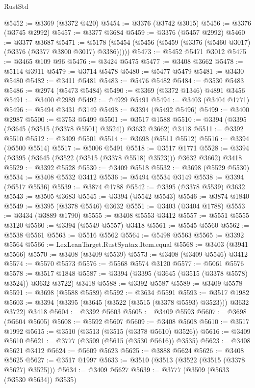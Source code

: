 \begin{lexlean}{RustStd}
\begin{coremodule}
@5452 := @3369 (@3372 @420)
@5454 := @3376 (@3742 @3015)
@5456 := @3376 (@3745 @2992)
@5457 := @3377 @3684
@5459 := @3376 (@5457 @2992)
@5460 := @3377 @3687
@5471 := @5178 (@5454 (@5456 (@5459 (@3376 (@5460 @3017) (@3376 (@3377 @3800 @3017) @3386)))))
@5473 := @5452 @5471 @3012
@5475 := @3465 @109 @96
@5476 := @3424 @5475
@5477 := @3408 @3662
@5478 := @5114 @3911
@5479 := @3714 @5478
@5480 := @5477 @5479
@5481 := @3430 @5480
@5482 := @3411 @5481
@5483 := @5476 @5482
@5484 := @3530 @5483
@5486 := @2974 (@5473 @5484)
@5490 := @3369 (@3372 @1346) @4891 @3456
@5491 := @3400 @2989
@5492 := @4929 @5491
@5494 := @3403 (@3404 @1771)
@5496 := @5494 @3431 @3149
@5498 := @3394 (@5492 @5496)
@5499 := @3400 @2987
@5500 := @3753 @5499
@5501 := @3517 @1588
@5510 := @3394 (@3395 (@3645 (@3515 (@3378 @5501) @3524)) @3632 @3662) @3418
@5511 := @3392 @5510
@5512 := @3409 @5501
@5514 := @3698 (@5511 @5512)
@5516 := @3394 (@5500 @5514)
@5517 := @5006 @5491
@5518 := @3517 @1771
@5528 := @3394 (@3395 (@3645 (@3522 (@3515 (@3378 @5518) @3523))) @3632 @3662) @3418
@5529 := @3392 @5528
@5530 := @3409 @5518
@5532 := @3698 (@5529 @5530)
@5534 := @3408 @5532 @3412
@5536 := @5494 @5534 @3149
@5538 := @3394 (@5517 @5536)
@5539 := @3874 @1788
@5542 := @3395 (@3378 @5539) @3632
@5543 := @3505 @3683
@5545 := @3394 (@5542 @5543)
@5546 := @3874 @1840
@5549 := @3395 (@3378 @5546) @3632
@5551 := @3403 (@3404 @1788)
@5553 := @3434 (@3889 @1790)
@5555 := @3408 @5553 @3412
@5557 := @5551 @5555 @3120
@5560 := @3394 (@5549 @5557) @3418
@5561 := @5545 @5560
@5562 := @5538 @5561
@5563 := @5516 @5562
@5564 := @5498 @5563
@5565 := @3392 @5564
@5566 := LexLeanTarget.RustSyntax.Item.equal
@5568 := @3403 (@3941 @5566)
@5570 := @3408 (@3409 @5539)
@5573 := @3408 (@3409 @5546) @3412
@5574 := @5570 @5573
@5576 := @5568 @5574 @3120
@5577 := @5061 @5576
@5578 := @3517 @1848
@5587 := @3394 (@3395 (@3645 (@3515 (@3378 @5578) @3524)) @3632 @3722) @3418
@5588 := @3392 @5587
@5589 := @3409 @5578
@5591 := @3698 (@5588 @5589)
@5592 := @3634 @5591
@5593 := @3517 @1982
@5603 := @3394 (@3395 (@3645 (@3522 (@3515 (@3378 @5593) @3523))) @3632 @3722) @3418
@5604 := @3392 @5603
@5605 := @3409 @5593
@5607 := @3698 (@5604 @5605)
@5608 := @5592 @5607
@5609 := @3408 @5608
@5610 := @3517 @1992
@5615 := @3510 (@3513 (@3515 (@3378 @5610) @3526))
@5616 := @3409 @5610
@5621 := @3777 (@3509 (@5615 (@3530 @5616)) @3535)
@5623 := @3408 @5621 @3412
@5624 := @5609 @5623
@5625 := @3888 @5624
@5626 := @3408 @5625
@5627 := @3517 @1997
@5633 := @3510 (@3513 (@3522 (@3515 (@3378 @5627) @3525)))
@5634 := @3409 @5627
@5639 := @3777 (@3509 (@5633 (@3530 @5634)) @3535)

\end{coremodule}
\end{lexlean}
